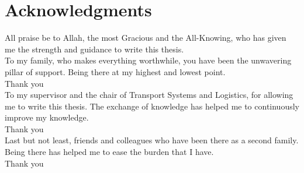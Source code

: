 \chapter*{Acknowledgments}

All praise be to Allah, the most Gracious and the All-Knowing, who has given me the strength and guidance to write this thesis.\\

To my family, who makes everything worthwhile, you have been the unwavering pillar of support. Being there at my highest and lowest point.\\

Thank you\\ 

To my supervisor and the chair of Transport Systems and Logistics, for allowing me to write this thesis. The exchange of knowledge has helped me to continuously improve my knowledge.\\ 

Thank you\\ 

Last but not least, friends and colleagues who have been there as a second family. Being there has helped me to ease the burden that I have.\\ 

Thank you\\  


